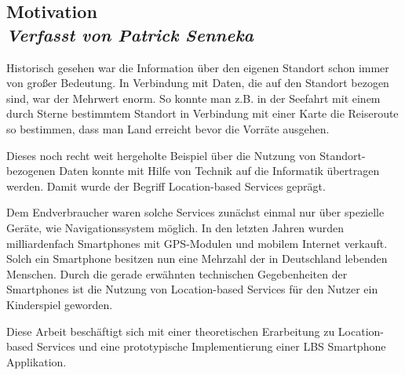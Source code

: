 \subsection[Motivation]{Motivation
 \\ \textnormal{\small{\textit {Verfasst von Patrick Senneka}}}}

Historisch gesehen war die Information über den eigenen Standort schon immer von großer Bedeutung. In Verbindung mit Daten, die auf den Standort bezogen sind, war der Mehrwert enorm. So konnte man z.B. in der Seefahrt mit einem durch Sterne bestimmtem Standort in Verbindung mit einer Karte die Reiseroute so bestimmen, dass man Land erreicht bevor die Vorräte ausgehen.

Dieses noch recht weit hergeholte Beispiel über die Nutzung von Standort-bezogenen Daten konnte mit Hilfe von Technik auf die Informatik übertragen werden. Damit wurde der Begriff Location-based Services geprägt. 

Dem Endverbraucher waren solche Services zunächst einmal nur über spezielle Geräte, wie Navigationssystem möglich. In den letzten Jahren wurden milliardenfach Smartphones mit GPS-Modulen und mobilem Internet verkauft. Solch ein Smartphone besitzen nun eine Mehrzahl der in Deutschland lebenden Menschen. \cite{bitkom} Durch die gerade erwähnten technischen Gegebenheiten der Smartphones ist die Nutzung von Location-based Services für den Nutzer ein Kinderspiel geworden. 

Diese Arbeit beschäftigt sich mit einer theoretischen Erarbeitung zu Location-based Services und eine prototypische Implementierung einer LBS Smartphone Applikation.

\newpage